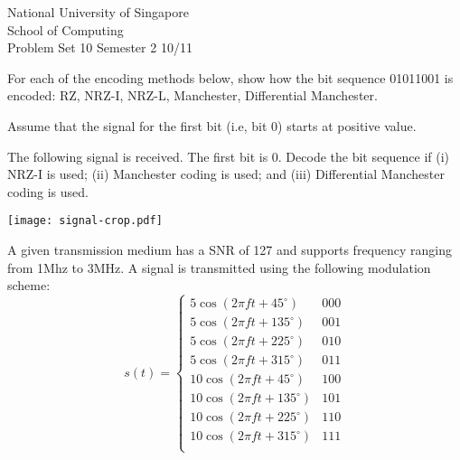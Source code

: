 \documentclass[a4paper,11pt]{exam}
\begin{document}
    \extraheadheight{.5in}
    {\large\sf National University of Singapore\\ School of Computing \\
    \LARGE\sf Problem Set 10}%
    {\large\sf Semester 2 10/11}
    \firstpageheadrule
    \pagestyle{headandfoot}

    \begin{questions}
	\question 
	For each of the encoding methods below, show how the bit 
	sequence 01011001 is encoded: RZ, NRZ-I, NRZ-L, Manchester, Differential Manchester.  
	
	Assume that the signal for the first bit (i.e, bit 0) starts at positive value.

	\question 
	The following signal is received.  The first bit is 0.  Decode the bit sequence if (i) NRZ-I is used; (ii) Manchester coding is used; and (iii) Differential Manchester coding is used.  

	\texttt{[image: signal-crop.pdf]}

	\question A given transmission medium has a SNR of 127 and supports frequency ranging from 1Mhz to 3MHz.  A signal is transmitted using the following modulation scheme:
	\[
	s(t) = \left\{\begin{array}{lr}
		5 \cos(2\pi ft + 45^\circ)  & 000\\
		5 \cos(2\pi ft + 135^\circ)  & 001\\
		5 \cos(2\pi ft + 225^\circ)  & 010\\
		5 \cos(2\pi ft + 315^\circ)  & 011\\
		10 \cos(2\pi ft + 45^\circ)  & 100\\
		10 \cos(2\pi ft + 135^\circ)  & 101\\
		10 \cos(2\pi ft + 225^\circ)  & 110\\
		10 \cos(2\pi ft + 315^\circ)  & 111\\
	\end{array}
		\right.
		\]
\question 

\end{questions}
\end{document}
